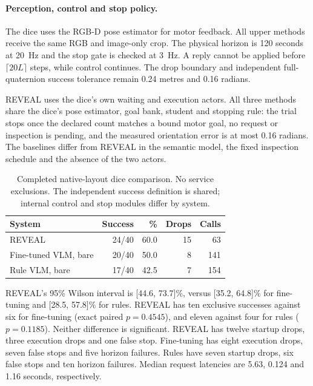 \paragraph{Perception, control and stop policy.}
The dice uses the RGB-D pose estimator for motor feedback. All upper methods receive the same RGB and image-only crop. The physical horizon is 120 seconds at 20~Hz and the stop gate is checked at 3~Hz. A reply cannot be applied before $\lceil20L\rceil$ steps, while control continues. The drop boundary and independent full-quaternion success tolerance remain 0.24 metres and 0.16 radians.

REVEAL uses the dice's own waiting and execution actors. All three methods share the dice's pose estimator, goal bank, student and stopping rule: the trial stops once the declared count matches a bound motor goal, no request or inspection is pending, and the measured orientation error is at most 0.16 radians. The baselines differ from REVEAL in the semantic model, the fixed inspection schedule and the absence of the two actors.

\begin{table}[t]
\centering\small
\begin{tabular}{lrrrr}
\toprule
System & Success & \% & Drops & Calls\\
\midrule
REVEAL & 24/40 & 60.0 & 15 & 63\\
Fine-tuned VLM, bare & 20/40 & 50.0 & 8 & 141\\
Rule VLM, bare & 17/40 & 42.5 & 7 & 154\\
\bottomrule
\end{tabular}
\caption{Completed native-layout dice comparison. No service exclusions. The independent success definition is shared; internal control and stop modules differ by system.}
\end{table}

REVEAL's 95\% Wilson interval is [44.6, 73.7]\%, versus [35.2, 64.8]\% for fine-tuning and [28.5, 57.8]\% for rules. REVEAL has ten exclusive successes against six for fine-tuning (exact paired $p=0.4545$), and eleven against four for rules ($p=0.1185$). Neither difference is significant. REVEAL has twelve startup drops, three execution drops and one false stop. Fine-tuning has eight execution drops, seven false stops and five horizon failures. Rules have seven startup drops, six false stops and ten horizon failures. Median request latencies are 5.63, 0.124 and 1.16 seconds, respectively.

